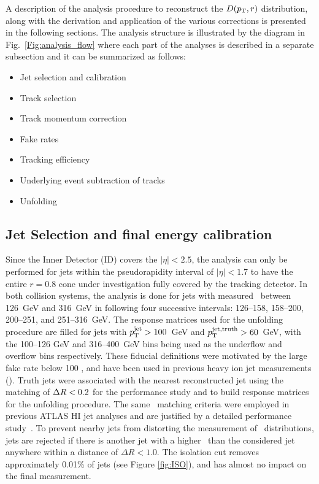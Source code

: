 
A description of the analysis procedure to reconstruct the $\mbox{$D( p_{\mathrm{T}}, r)$}$ distribution, along with the derivation and application of the various corrections is presented in the following sections. The analysis structure is illustrated by the diagram in Fig.~\ref{Fig:analysis_flow} where each part of the analyses is described in a separate subsection and it can be summarized as follows: 


\begin{itemize}
\item Jet selection and calibration
\item Track selection
\item Track momentum correction
\item Fake rates
\item Tracking efficiency
\item Underlying event subtraction of tracks
\item Unfolding
\end{itemize}


\subsection{Jet Selection and final energy calibration}
\label{Sec:JetSelection}
Since the Inner Detector (ID) covers the $|\eta| < 2.5$, the analysis can 
only be performed for jets within the pseudorapidity interval of $|\eta| < 1.7$ to have the entire $ r =  0.8$ cone under investigation fully covered by the tracking detector. In both collision systems, the analysis is done for jets with  
measured \ptjet\ between 126~GeV and 316~GeV in following four successive intervals: \mbox{126--158}, \mbox{158--200}, \mbox{200--251}, and \mbox{251--316}~GeV. The response matrices used for the unfolding procedure are filled for jets with $\mbox{$p_{\mathrm{T}}^{\mathrm{jet}}$} > 100$~GeV and \mbox{$\mbox{$p_{{\mathrm{T}}}^{\mathrm{jet,truth}}$} > 60$ GeV}, with the \mbox{100--126} GeV and \mbox{316--400}~GeV bins being used as the underflow and overflow bins respectively. 
These fiducial definitions were motivated by the large fake rate below 100 \GeV, and have been used in previous heavy ion jet measurements (\cite{ATLAS502FFConf}). Truth jets were associated with the nearest reconstructed jet using the matching of $\mbox{$\Delta R$}<0.2$ for the performance study and to build response matrices for the unfolding procedure. The same \dR\ matching criteria were employed in previous ATLAS HI jet analyses and are justified by a detailed performance study~\cite{Aad:12081967v1}. To prevent nearby jets from distorting the measurement of \Dptr\ distributions, 
jets are rejected if there is another jet with a higher \ptjet\ than the considered jet anywhere
within a distance of $\Delta R < 1.0$. The isolation cut removes approximately 0.01\% of jets (see Figure \ref{fig:ISO}), and has almost no impact on the final measurement.


